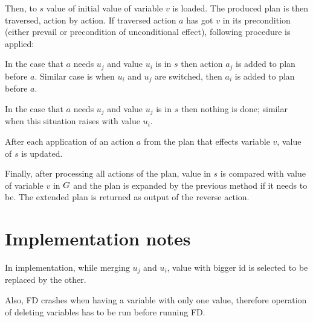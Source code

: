 	Then, to $s$ value of initial value of variable $v$ is loaded. The produced plan is then traversed, action by action. If traversed action $a$ has got $v$ in its precondition (either prevail or precondition of unconditional effect), following procedure is applied:
	
	In the case that $a$ needs $u_j$ and value $u_i$ is in $s$ then action $a_j$ is added to plan before $a$. Similar case is when $u_i$ and $u_j$ are switched, then $a_i$ is added to plan before $a$.
	
	In the case that $a$ needs $u_j$ and value $u_j$ is in $s$ then nothing is done; similar when this situation raises with value $u_i$.
	
	After each application of an action $a$ from the plan that effects variable $v$, value of $s$ is updated.
	
	Finally, after processing all actions of the plan, value in $s$ is compared with value of variable $v$ in $G$ and the plan is expanded by the previous method if it needs to be. The extended plan is returned as output of the reverse action.
	
	
	\section{Implementation notes}
	In implementation, while merging $u_j$ and $u_i$, value with bigger id is selected to be replaced by the other.
	
	Also, FD crashes when having a variable with only one value, therefore operation of deleting variables has to be run before running FD.
	
	